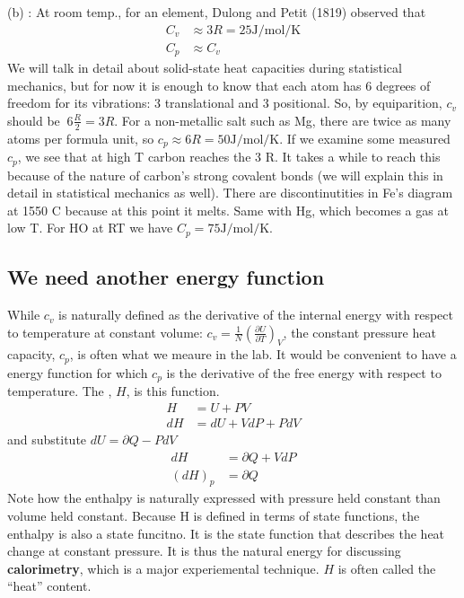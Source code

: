 \documentclass[12pt]{article}
\begin{document}
(b) : At room temp., for an element, Dulong and Petit (1819) observed that
\begin{align*}
C_v &\approx 3 R = 25 \text{J}/\text{mol}/\text{K}\\
C_p & \approx C_v
\end{align*}
We will talk in detail about solid-state heat capacities during statistical mechanics, but for now it is enough to know that each atom has 6 degrees of freedom for its vibrations: 3 translational and 3 positional. So, by equiparition, $c_v$ should be $~6 \frac{R}{2}=3R$. For a non-metallic salt such as Mg, there are twice as many atoms per formula unit, so $c_p \approx 6 R = 50\text{J}/\text{mol}/\text{K}$.   If we examine some measured  $c_p$, we see that at high T carbon reaches the 3 R.  It takes a while to reach this because of the nature of carbon's strong covalent bonds (we will explain this in detail in statistical mechanics as well).  There are discontinutities in Fe's diagram at 1550 \degree C because at this point it melts.  Same with Hg, which becomes a gas at low T.  For H\2O at RT we have $C_p = 75 \text{J}/\text{mol}/\text{K}$.

\subsection{We need another energy function}
While $c_v$ is naturally defined as the derivative of the internal energy with respect to temperature at constant volume: $c_v = \frac{1}{N} \left(\frac{\partial U}{\partial T}\right)_V$, the constant pressure heat capacity, $c_p$, is often what we meaure in the lab. It would be convenient to have a energy function for which $c_p$ is the derivative of the free energy with respect to temperature. The , $H$, is this function.
\begin{align*}
H &= U + PV\\
dH &= dU + V dP + P dV
\end{align*}
and substitute $dU = \partial Q - P dV$
\begin{align*}
dH &= \partial Q + V dP\\
(dH)_p &= \partial Q
\end{align*}
Note how the enthalpy is naturally expressed with pressure held constant than volume held constant. Because H is defined in terms of state functions, the enthalpy is also a state funcitno. It is the state function that describes the heat change at constant pressure.  It is thus the natural energy for discussing \textbf{calorimetry}, which is a major experiemental technique.  $H$ is often called the ``heat'' content.\\
\end{document}
